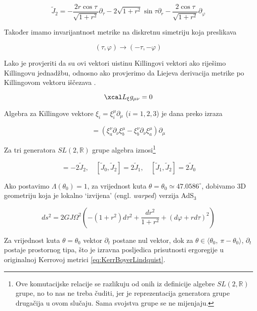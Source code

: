 \begin{equation}
\tilde{J}_2=-\frac{2r\cos\tau}{\sqrt{1+r^2}}\partial_\tau-2\sqrt{1+r^2}\sin\tau\partial_r-\frac{2\cos\tau}{\sqrt{1+r^2}}\partial_\varphi
\end{equation}

\noindent Također imamo invarijantnost metrike na diskretnu simetriju koja preslikava

\begin{equation*}
(\tau,\varphi)\to(-\tau,-\varphi)
\end{equation*}

Lako je provjeriti da su ovi vektori uistinu Killingovi vektori ako riješimo Killingovu jednadžbu, odnosno ako provjerimo da Liejeva derivacija metrike po Killingovom vektoru iščezava \citep{Guica:2008mu}.

\begin{equation}
\Lie_\xi g_{\mu\nu}=0
\end{equation}

\noindent Algebra za Killingove vektore $\xi_i=\xi^\mu_i\partial_\mu$ ($i=1,2,3$) je dana preko izraza

\begin{equation*}
[\xi_a,\xi_b]=(\xi^\nu_a\partial_\nu\xi^\mu_b-\xi^\nu_b\partial_\nu\xi^\mu_a)\partial_\mu
\end{equation*} 

\noindent Za tri generatora $SL(2,\mathbb{R})$ grupe algebra iznosi\footnote{Ove komutacijske relacije se razlikuju od onih iz definicije algebre $SL(2,\mathbb{R})$ grupe, no to nas ne treba čuditi, jer je reprezentacija generatora grupe drugačija u ovom slučaju. Sama svojstva grupe se ne mijenjaju.}

\begin{equation}
[\tilde{J}_0,\tilde{J}_1]=-2\tilde{J}_2,\quad [\tilde{J}_0,\tilde{J}_2]=2\tilde{J}_1,\quad [\tilde{J}_1,\tilde{J}_2]=2\tilde{J}_0
\end{equation}

Ako postavimo $\Lambda(\theta_0)=1$, za vrijednost kuta $\theta=\theta_0\simeq 47.0586^\circ$,  dobivamo 3D geometriju koja je lokalno ‘izvijena’ (engl. \textit{warped}) verzija AdS${}_3$

\begin{equation}
ds^2=2GJ\Omega^2\left(-(1+r^2)d\tau^2+\frac{dr^2}{1+r^2}+(d\varphi+rd\tau)^2\right)
\label{eq:lokizvijena}
\end{equation}

\noindent Za vrijednost kuta $\theta=\theta_0$ vektor $\partial_t$ postane nul vektor, dok za $\theta\in\langle \theta_0,\ \pi-\theta_0\rangle$, $\partial_t$ postaje prostornog tipa, što je izravna posljedica prisutnosti ergoregije u originalnoj Kerrovoj metrici \eqref{eq:KerrBoyerLindquist}. 

